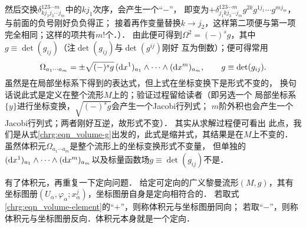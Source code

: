 然后交换$\delta_{k j_1 j_3\cdots j_m}^{12 3\cdots m}$中的$k j_1$次序，会产生一个“$-$”，
即变为$+\delta_{j_1 kj_3\cdots j_m}^{12 3\cdots m}g^{2 k}g^{1 j_1} \cdots g^{m j_m}$，与前面的负号刚好负负得正；
接着再作变量替换$k \to j_2$，这样第二项便与第一项完全相同；这样的项共有$m!$个．）．
由此便可得到$\Omega^2=(-)^s g$，其中$g\equiv \det(g_{ij})$（注$\det(g_{ij})$与$\det(g^{ij})$刚好
互为倒数）；便可得常用
\begin{equation}\label{chrg:eqn_volume-element}
    \Omega_{a_1 \cdots a_m}= \pm \sqrt{(-)^s g}\, ({\rm d}x^1)_{a_1} \wedge \cdots \wedge({\rm d}x^m)_{a_m},
    \qquad g\equiv \det(g_{ij}).
\end{equation}
虽然是在局部坐标系下得到的表达式，但上式在坐标变换下是形式不变的，
换句话说此式是定义在整个流形$M$上的；验证过程留给读者（即另选一个
局部坐标系$\{y\}$进行坐标变换，$\sqrt{(-)^s g}$会产生一个Jacobi行列式；
$m$阶外积也会产生一个Jacobi行列式；两者刚好互逆，故形式不变）．
其实从求解过程便可看出
此点，我们是从式\eqref{chrg:eqn_volume-g}出发的，此式是缩并式，其结果是在$M$上不变的．
虽然体积元$\Omega_{a_1 \cdots a_m}$是整个流形上的坐标变换形式不变量，
但单独的$({\rm d}x^1)_{a_1} \wedge \cdots \wedge({\rm d}x^m)_{a_m}$以及标量函数场$g\equiv \det(g_{ij})$不是．



有了体积元，再重复一下定向问题．  %
给定可定向的广义黎曼流形$(M,g)$，其有
坐标图册$(U_\alpha,\varphi_\alpha;x^j_\alpha)$，坐标图册自身是定向相符合的．
若取式\eqref{chrg:eqn_volume-element}的“$+$”，则称体积元与坐标图册同向；
若取“$-$”，则称体积元与坐标图册反向．体积元本身就是一个定向．






